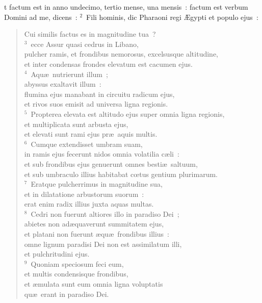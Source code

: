 \bchapter
{}t factum est in anno undecimo, tertio mense, una mensis~: factum est verbum Domini ad me, dicens~:
${}^{2}$~Fili hominis, dic Pharaoni regi \AE gypti et populo ejus~: \begin{verse}Cui similis factus es in magnitudine tua~?\\
${}^{3}$~ecce Assur quasi cedrus in Libano,\\ pulcher ramis, et frondibus nemorosus, excelsusque altitudine,\\ et inter condensas frondes elevatum est cacumen ejus.\\
${}^{4}$~Aqu\ae\ nutrierunt illum~;\\ abyssus exaltavit illum~:\\ flumina ejus manabant in circuitu radicum ejus,\\ et rivos suos emisit ad universa ligna regionis.\\
${}^{5}$~Propterea elevata est altitudo ejus super omnia ligna regionis,\\ et multiplicata sunt arbusta ejus,\\ et elevati sunt rami ejus pr\ae\ aquis multis.\\
${}^{6}$~Cumque extendisset umbram suam,\\ in ramis ejus fecerunt nidos omnia volatilia c\ae li~:\\ et sub frondibus ejus genuerunt omnes besti\ae\ saltuum,\\ et sub umbraculo illius habitabat cœtus gentium plurimarum.\\
${}^{7}$~Eratque pulcherrimus in magnitudine sua,\\ et in dilatatione arbustorum suorum~:\\ erat enim radix illius juxta aquas multas.\\
${}^{8}$~Cedri non fuerunt altiores illo in paradiso Dei~;\\ abietes non ad\ae quaverunt summitatem ejus,\\ et platani non fuerunt \ae qu\ae\ frondibus illius~:\\ omne lignum paradisi Dei non est assimilatum illi,\\ et pulchritudini ejus.\\
${}^{9}$~Quoniam speciosum feci eum,\\ et multis condensisque frondibus,\\ et \ae mulata sunt eum omnia ligna voluptatis\\ qu\ae\ erant in paradiso Dei.\end{verse}



